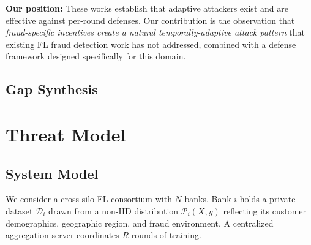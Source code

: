\documentclass[10pt,journal]{IEEEtran}
\begin{document}
\textbf{Our position:} These works establish that adaptive attackers exist and are effective against per-round defenses. Our contribution is the observation that \emph{fraud-specific incentives create a natural temporally-adaptive attack pattern} that existing FL fraud detection work has not addressed, combined with a defense framework designed specifically for this domain.

\subsection{Gap Synthesis}

\begin{table}[t]
\centering
\caption{Literature gap analysis.}
\label{tab:gaps}
\footnotesize
{}
\end{table}

\section{Threat Model}
\label{sec:threat}

\subsection{System Model}

We consider a cross-silo FL consortium with $N$ banks. Bank $i$ holds a private dataset $\mathcal{D}_i$ drawn from a non-IID distribution $\mathcal{P}_i(X, y)$ reflecting its customer demographics, geographic region, and fraud environment. A centralized aggregation server coordinates $R$ rounds of training.
\end{document}

